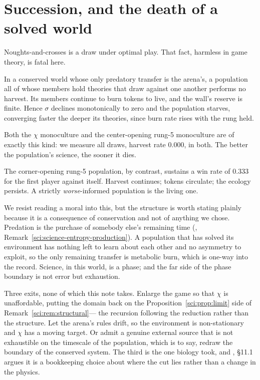 \section{Succession, and the death of a solved world}\label{gam:sec:death}\label{gam:S10}

Noughts-and-crosses is a draw under optimal play. That fact, harmless in game
theory, is fatal here.

\begin{proposition}\label{gam:solved-science-dead-ecology}
In a conserved world whose only predatory transfer is the arena's, a population
all of whose members hold theories that draw against one another performs no
harvest. Its members continue to burn tokens to live, and the wall's reserve is
finite. Hence $\sigma$ declines monotonically to zero and the population starves,
converging faster the deeper its theories, since burn rate rises with the rung
held.
\end{proposition}

Both the $\chi$ monoculture and the center-opening rung-5 monoculture are of
exactly this kind: we measure all draws, harvest rate $0.000$, in both. The
better the population's science, the sooner it dies.

\begin{corollary}\label{gam:imperfection-load-bearing}
The corner-opening rung-5 population, by contrast, sustains a win rate of
$0.333$ for the first player against itself. Harvest continues; tokens
circulate; the ecology persists. A strictly \emph{worse}-informed population is
the living one.
\end{corollary}

We resist reading a moral into this, but the structure is worth stating plainly
because it is a consequence of conservation and not of anything we chose.
Predation is the purchase of somebody else's remaining time (\chSci,
Remark~\ref{sci:science-entropy-production}). A population that has solved its environment has nothing left to
learn about each other and no asymmetry to exploit, so the only remaining
transfer is metabolic burn, which is one-way into the record. Science, in this
world, is a phase; and the far side of the phase boundary is not error but
exhaustion.

\begin{remark}\label{gam:what-would-keep-alive}
Three exits, none of which this note takes. Enlarge the game so that $\chi$ is
unaffordable, putting the domain back on the Proposition~\ref{sci:prop:limit} side of Remark~\ref{sci:rem:structural}---
the recursion following the reduction rather than the structure. Let the arena's
rules drift, so the environment is non-stationary and $\chi$ has a moving
target. Or admit a genuine external source that is not exhaustible on the
timescale of the population, which is to say, redraw the boundary of the
conserved system. The third is the one biology took, and \chSci,
\S11.1 argues it is a bookkeeping choice about where the cut lies rather than a
change in the physics.
\end{remark}

